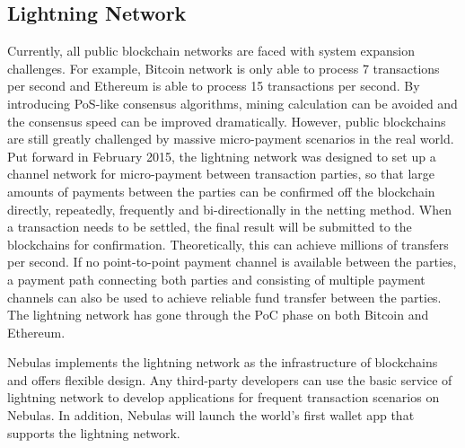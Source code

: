 \subsection{Lightning Network}

Currently, all public blockchain networks are faced with system expansion challenges. For example, Bitcoin network is only able to process 7 transactions per second and Ethereum is able to process 15 transactions per second. By introducing PoS-like consensus algorithms, mining calculation can be avoided and the consensus speed can be improved dramatically. However, public blockchains are still greatly challenged by massive micro-payment scenarios in the real world. Put forward in February 2015, the lightning network \cite{poon2015bitcoin} was designed to set up a channel network for micro-payment between transaction parties, so that large amounts of payments between the parties can be confirmed off the blockchain directly, repeatedly, frequently and bi-directionally in the netting method. When a transaction needs to be settled, the final result will be submitted to the blockchains for confirmation. Theoretically, this can achieve millions of transfers per second. If no point-to-point payment channel is available between the parties, a payment path connecting both parties and consisting of multiple payment channels can also be used to achieve reliable fund transfer between the parties. The lightning network has gone through the PoC phase on both Bitcoin and Ethereum. 


Nebulas implements the lightning network as the infrastructure of blockchains and offers flexible design. Any third-party developers can use the basic service of lightning network to develop applications for frequent transaction scenarios on Nebulas. In addition, Nebulas will launch the world's first wallet app that supports the lightning network.

